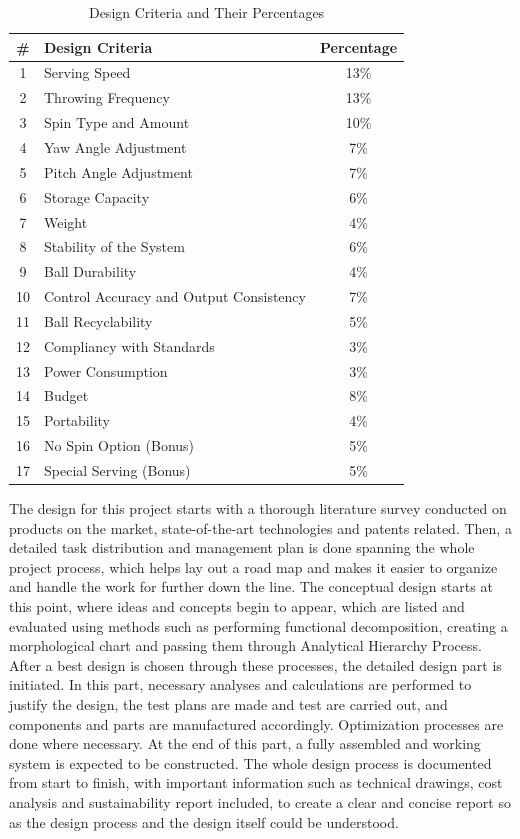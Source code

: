 \documentclass[12pt]{report}
\begin{document}
\begin{table}[H]
\centering
\begin{tabular}{|c|p{7cm}|c|}
\hline
\textbf{\#} & \textbf{Design Criteria} & \textbf{Percentage} \\ \hline
1 & Serving Speed & 13\% \\ \hline
2 & Throwing Frequency & 13\% \\ \hline
3 & Spin Type and Amount & 10\% \\ \hline
4 & Yaw Angle Adjustment & 7\% \\ \hline
5 & Pitch Angle Adjustment & 7\% \\ \hline
6 & Storage Capacity & 6\% \\ \hline
7 & Weight & 4\% \\ \hline
8 & Stability of the System & 6\% \\ \hline
9 & Ball Durability & 4\% \\ \hline
10 & Control Accuracy and Output Consistency & 7\% \\ \hline
11 & Ball Recyclability & 5\% \\ \hline
12 & Compliancy with Standards & 3\% \\ \hline
13 & Power Consumption & 3\% \\ \hline
14 & Budget & 8\% \\ \hline
15 & Portability & 4\% \\ \hline
16 & No Spin Option (Bonus) & 5\% \\ \hline
17 & Special Serving (Bonus) & 5\% \\ \hline
\end{tabular}
\caption{Design Criteria and Their Percentages}
\label{tab:design_criteria}
\end{table}

The design for this project starts with a thorough literature survey conducted on products on the market, state-of-the-art technologies and patents related. Then, a detailed task distribution and management plan is done spanning the whole project process, which helps lay out a road map and makes it easier to organize and handle the work for further down the line. The conceptual design starts at this point, where ideas and concepts begin to appear, which are listed and evaluated using methods such as performing functional decomposition, creating a morphological chart and passing them through Analytical Hierarchy Process. After a best design is chosen through these processes, the detailed design part is initiated. In this part, necessary analyses and calculations are performed to justify the design, the test plans are made and test are carried out, and components and parts are manufactured accordingly. Optimization processes are done where necessary. At the end of this part, a fully assembled and working system is expected to be constructed. The whole design process is documented from start to finish, with important information such as technical drawings, cost analysis and sustainability report included, to create a clear and concise report so as the design process and the design itself could be understood. 
\end{document}
